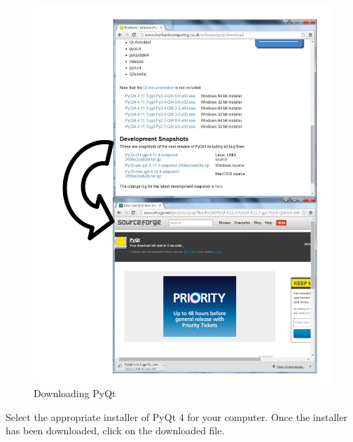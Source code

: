 \begin{figure}[H]
    \includegraphics[width=\textwidth]{./Manual/Images/DownloadingPyQt.pdf}
    \caption{Downloading PyQt} \label{fig:DownloadingPyQt}
\end{figure}

Select the appropriate installer of PyQt 4 for your computer. Once the installer has been downloaded, click on the downloaded file.

